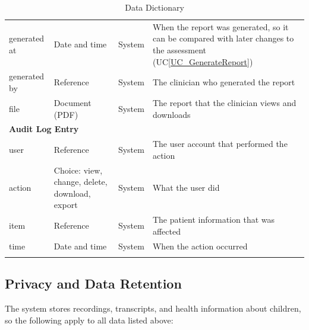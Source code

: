 \documentclass[12pt]{article}
\newcommand{\ucref}[1]{UC\ref{#1}}
\begin{document}
\begin{longtable}{p{} p{} p{} p{}}
\midrule
generated at & Date and time & System & When the report was generated, so it can be compared with later changes to the assessment (\ucref{UC_GenerateReport})\\
generated by & Reference & System & The clinician who generated the report\\
file & Document (PDF) & System & The report that the clinician views and downloads\\
\midrule
\multicolumn{4}{l}{\textbf{Audit Log Entry}}\\
\midrule
user & Reference & System & The user account that performed the action\\
action & Choice: view, change, delete, download, export & System & What the user did\\
item & Reference & System & The patient information that was affected\\
time & Date and time & System & When the action occurred\\
\bottomrule
\caption{Data Dictionary} \label{tab:DataDictionary}
\end{longtable}

\subsection{Privacy and Data Retention} \label{sec:PrivacyRetention}

The system stores recordings, transcripts, and health information about children, so the following apply to all data listed above:
\end{document}
